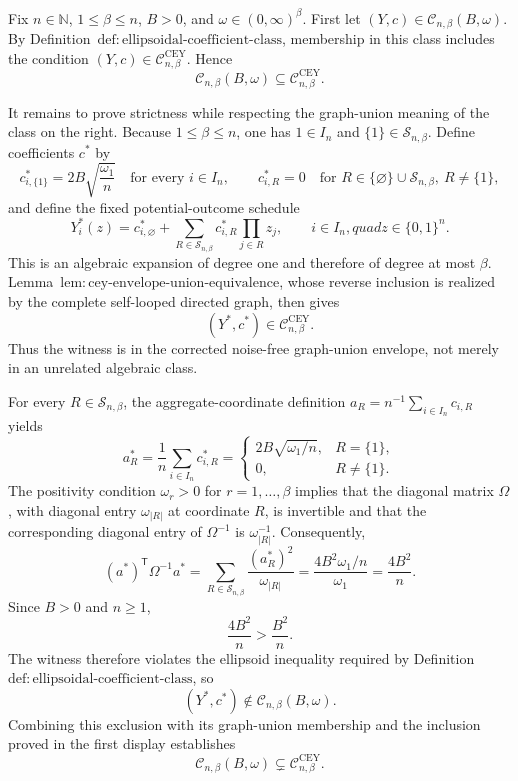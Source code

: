 Fix \(n\in\mathbb N\), \(1\leq\beta\leq n\), \(B>0\), and \(\omega\in(0,\infty)^\beta\).  First let \((Y,c)\in\mathcal C_{n,\beta}(B,\omega)\).  By Definition~\(\mathrm{def{:}ellipsoidal\text{-}coefficient\text{-}class}\), membership in this class includes the condition \((Y,c)\in\mathcal C^{\mathrm{CEY}}_{n,\beta}\).  Hence
\[
\mathcal C_{n,\beta}(B,\omega)
\subseteq
\mathcal C^{\mathrm{CEY}}_{n,\beta}.
\]

It remains to prove strictness while respecting the graph-union meaning of the class on the right.  Because \(1\leq\beta\leq n\), one has \(1\in I_n\) and \(\{1\}\in\mathcal S_{n,\beta}\).  Define coefficients \(c^*\) by
\[
c^*_{i,\{1\}}=2B\sqrt{\frac{\omega_1}{n}}
\quad\text{for every }i\in I_n,
\qquad
c^*_{i,R}=0
\quad\text{for }R\in\{\varnothing\}\cup\mathcal S_{n,\beta},\ R\neq\{1\},
\]
and define the fixed potential-outcome schedule
\[
Y_i^*(z)
=c^*_{i,\varnothing}
+\sum_{R\in\mathcal S_{n,\beta}}c^*_{i,R}
  \prod_{j\in R}z_j,
\qquad i\in I_n,quad z\in\{0,1\}^n.
\]
This is an algebraic expansion of degree one and therefore of degree at most \(\beta\).  Lemma~\(\mathrm{lem{:}cey\text{-}envelope\text{-}union\text{-}equivalence}\), whose reverse inclusion is realized by the complete self-looped directed graph, then gives
\[
(Y^*,c^*)\in\mathcal C^{\mathrm{CEY}}_{n,\beta}.
\]
Thus the witness is in the corrected noise-free graph-union envelope, not merely in an unrelated algebraic class.

For every \(R\in\mathcal S_{n,\beta}\), the aggregate-coordinate definition \(a_R=n^{-1}\sum_{i\in I_n}c_{i,R}\) yields
\[
a_R^*
=\frac1n\sum_{i\in I_n}c^*_{i,R}
=
\begin{cases}
2B\sqrt{\omega_1/n},&R=\{1\},\\
0,&R\neq\{1\}.
\end{cases}
\]
The positivity condition \(\omega_r>0\) for \(r=1,\ldots,\beta\) implies that the diagonal matrix \(\Omega\), with diagonal entry \(\omega_{|R|}\) at coordinate \(R\), is invertible and that the corresponding diagonal entry of \(\Omega^{-1}\) is \(\omega_{|R|}^{-1}\).  Consequently,
\[
(a^*)^{\mathsf T}\Omega^{-1}a^*
=\sum_{R\in\mathcal S_{n,\beta}}
  \frac{(a_R^*)^2}{\omega_{|R|}}
=\frac{4B^2\omega_1/n}{\omega_1}
=\frac{4B^2}{n}.
\]
Since \(B>0\) and \(n\geq1\),
\[
\frac{4B^2}{n}>\frac{B^2}{n}.
\]
The witness therefore violates the ellipsoid inequality required by Definition~\(\mathrm{def{:}ellipsoidal\text{-}coefficient\text{-}class}\), so
\[
(Y^*,c^*)\notin\mathcal C_{n,\beta}(B,\omega).
\]
Combining this exclusion with its graph-union membership and the inclusion proved in the first display establishes
\[
\mathcal C_{n,\beta}(B,\omega)
\subsetneq
\mathcal C^{\mathrm{CEY}}_{n,\beta}.
\]